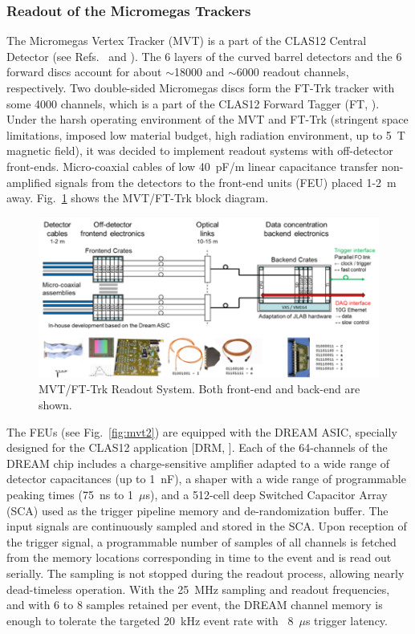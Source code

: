 \subsubsection{Readout of the Micromegas Trackers}

The Micromegas Vertex Tracker (MVT) is a part of the CLAS12 Central Detector (see Refs.~\cite{mvt-ref} and \cite{ftt-ref}). The 6 layers of the curved barrel detectors and the 6 forward discs account for about $\sim$18000 and $\sim$6000 readout channels, respectively. Two double-sided Micromegas discs form the FT-Trk tracker with some 4000 channels, which is a part of the CLAS12 Forward Tagger (FT, \cite{ft-ref}). Under the harsh operating environment of the MVT and FT-Trk (stringent space limitations, imposed low material budget, high radiation environment, up to 5~T magnetic field), it was decided to implement readout systems with off-detector front-ends. Micro-coaxial cables of low 40~pF/m linear capacitance transfer non-amplified signals from the detectors to the front-end units (FEU) placed 1-2~m away. Fig.~\ref{fig:mvt1} shows the MVT/FT-Trk block diagram.

\begin{figure}[hbt]
	\centering
	\includegraphics[width=1.0\columnwidth,keepaspectratio]{img/mvt1.png}
	\caption{MVT/FT-Trk Readout System. Both front-end and back-end are shown.}
	\label{fig:mvt1}
\end{figure}

The FEUs (see Fig.~\ref{fig:mvt2}) are equipped with the DREAM ASIC, specially designed for the CLAS12 application [DRM, \cite{dream-ref}]. Each of the 64-channels of the DREAM chip includes a charge-sensitive amplifier adapted to a wide range of detector capacitances (up to 1~nF), a shaper with a wide range of programmable peaking times (75~ns to 1~$\mu$s), and a 512-cell deep Switched Capacitor Array (SCA) used as the trigger pipeline memory and de-randomization buffer. The input signals are continuously sampled and stored in the SCA. Upon reception of the trigger signal, a programmable number of samples of all channels is fetched from the memory locations corresponding in time to the event and is read out serially. The sampling is not stopped during the readout process, allowing nearly dead-timeless operation. With the 25~MHz sampling and readout frequencies, and with 6 to 8 samples retained per event, the DREAM channel memory is enough to tolerate the targeted 20~kHz event rate with ~8~$\mu$s trigger latency.

